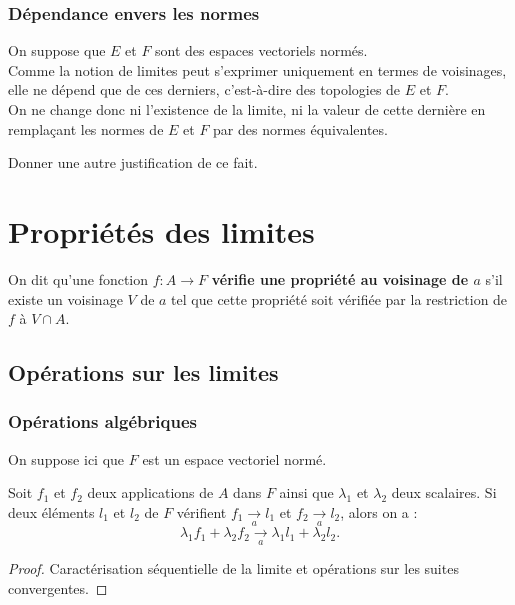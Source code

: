 \documentclass[french]{article}
\theoremstyle{plain}
\theoremstyle{definition}
\theoremstyle{remark}
\begin{document}
\subsubsection*{Dépendance envers les normes}
On suppose que $E$ et $F$ sont des espaces vectoriels normés.\\
Comme la notion de limites peut s'exprimer uniquement en termes de voisinages, elle ne dépend que de ces derniers, c'est-à-dire des topologies de $E$ et $F$. \\
On ne change donc ni l'existence de la limite, ni la valeur de cette dernière en remplaçant les normes de $E$ et $F$ par des normes équivalentes.
\begin{exo}
	Donner une autre justification de ce fait. %
\end{exo}

\section{Propriétés des limites}

On dit qu'une fonction $f:A\to F$ \textbf{vérifie une propriété au voisinage de $a$} s'il existe un voisinage $V$ de $a$ tel que cette propriété soit vérifiée par la restriction de $f$ à $V\cap A$.

\subsection{Opérations sur les limites}

\subsubsection*{Opérations algébriques}

On suppose ici que $F$ est un espace vectoriel normé.

\begin{prop}%
	Soit $f_1$ et $f_2$ deux applications de $A$ dans $F$ ainsi que $\lambda_1$ et $\lambda_2$ deux scalaires. Si deux éléments $l_1$ et $l_2$ de $F$ vérifient $f_1\xrightarrow[a]{}l_1$ et $f_2\xrightarrow[a]{}l_2$, alors on a : $$\lambda_1f_1+\lambda_2f_2\xrightarrow[a]{}\lambda_1l_1+\lambda_2l_2.$$
\end{prop}
\begin{proof}
	Caractérisation séquentielle de la limite et opérations sur les suites convergentes.
\end{proof}
\end{document}
